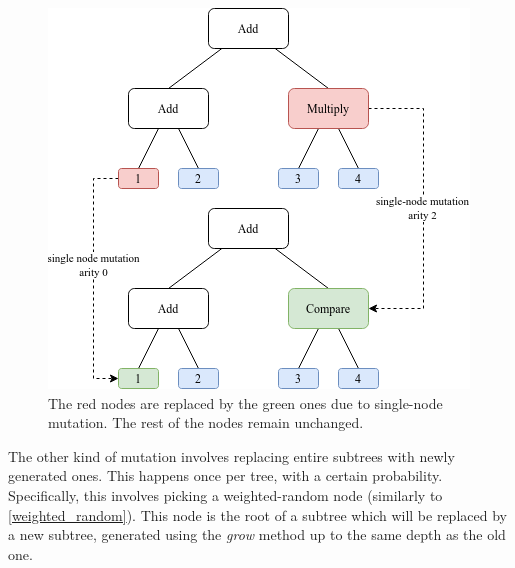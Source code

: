 \documentclass{report}
\begin{document}
\begin{figure}[H]
    \centering
    \includegraphics[scale=0.75]{single_mutation}
    \caption{The red nodes are replaced by the green ones due to single-node mutation. The rest of the nodes remain unchanged.}
\end{figure}

The other kind of mutation involves replacing entire subtrees with newly generated ones. This happens once per tree, with a certain probability. Specifically, this involves picking a weighted-random node (similarly to \autoref{weighted_random}). This node is the root of a subtree which will be replaced by a new subtree, generated using the \emph{grow} method up to the same depth as the old one.
\end{document}
